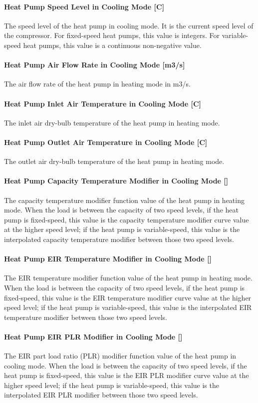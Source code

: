 \paragraph{Heat Pump Speed Level in Cooling Mode {[}C{]}} The speed level of the
heat pump in cooling mode. It is the current speed level of the compressor. For
fixed-speed heat pumps, this value is integers. For variable-speed heat pumps,
this value is a continuous non-negative value.
\paragraph{Heat Pump Air Flow Rate in Cooling Mode {[}m3/s{]}}
The air flow rate of the heat pump in heating mode in m3/s.
\paragraph{Heat Pump Inlet Air Temperature in Cooling Mode {[}C{]}}
The inlet air dry-bulb temperature of the heat pump in heating mode.
\paragraph{Heat Pump Outlet Air Temperature in Cooling Mode {[}C{]}}
The outlet air dry-bulb temperature of the heat pump in heating mode.
\paragraph{Heat Pump Capacity Temperature Modifier in Cooling Mode {[}{]}}
The capacity temperature modifier function value of the heat pump in heating
mode. When the load is between the capacity of two speed levels, if the heat
pump is fixed-speed, this value is the capacity temperature modifier curve value
at the higher speed level; if the heat pump is variable-speed, this value is the
interpolated capacity temperature modifier between those two speed levels.
\paragraph{Heat Pump EIR Temperature Modifier in Cooling Mode {[}{]}}
The EIR temperature modifier function value of the heat pump in heating
mode. When the load is between the capacity of two speed levels, if the heat
pump is fixed-speed, this value is the EIR temperature modifier curve value
at the higher speed level; if the heat pump is variable-speed, this value is the
interpolated EIR temperature modifier between those two speed levels.
\paragraph{Heat Pump EIR PLR Modifier in Cooling Mode {[}{]}}
The EIR part load ratio (PLR) modifier function value of the heat pump in cooling
mode. When the load is between the capacity of two speed levels, if the heat
pump is fixed-speed, this value is the EIR PLR modifier curve value
at the higher speed level; if the heat pump is variable-speed, this value is the
interpolated EIR PLR modifier between those two speed levels.
